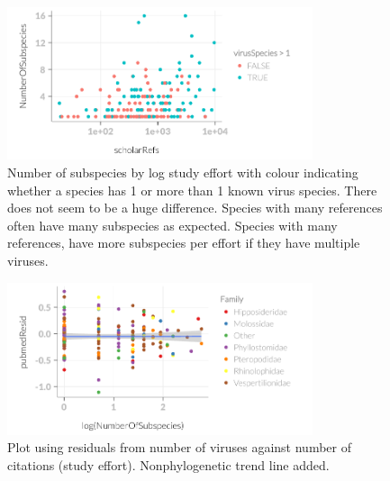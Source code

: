 \begin{knitrout}\footnotesize
{}\color{fgcolor}\begin{figure}[t]

{\centering \includegraphics[width=0.8\textwidth]{figure/OneorMoreVir-1} 

}

\caption[Number of subspecies by study effort]{Number of subspecies by log study effort with colour indicating whether a species has 1 or more than 1 known virus species.
There does not seem to be a huge difference.
Species with many references often have many subspecies as expected.
Species with many references, have more subspecies per effort if they have multiple viruses.}\label{fig:OneorMoreVir}
\end{figure}


\end{knitrout}


\begin{knitrout}\footnotesize
{}\color{fgcolor}\begin{figure}[t]

{\centering \includegraphics[width=0.8\textwidth]{figure/pubmedresidPlot-1} 

}

\caption[Plot using residuals from number of viruses against number of citations (study effort)]{Plot using residuals from number of viruses against number of citations (study effort). Nonphylogenetic trend line added. }\label{fig:pubmedresidPlot}
\end{figure}


\end{knitrout}


